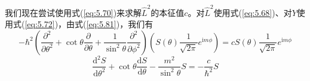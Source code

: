     我们现在尝试使用式(\ref{eq:5.70})来求解$\hat{L}^2$的本征值$c$。对$\hat{L}^2$使用式(\ref{eq:5.68})、对$Y$使用式(\ref{eq:5.72})，由式(\ref{eq:5.81})，我们有
    \begin{equation*}
        -\hbar^2\left(\frac{\partial^2}{\partial\theta^2} + \cot\theta\frac{\partial}{\partial\theta} + \frac{1}{\sin^2\theta}\frac{\partial^2}{\partial\phi^2}\right)\left(S\left(\theta\right)\frac{1}{\sqrt{2\pi}}e^{\mathrm{i}m\phi}\right) = cS\left(\theta\right)\frac{1}{\sqrt{2\pi}}e^{\mathrm{i}m\phi}
    \end{equation*}
    \begin{equation}
        \frac{\mathrm{d}^2S}{\mathrm{d}\theta^2}+\cot\theta\frac{\mathrm{d}S}{\mathrm{d}\theta} - \frac{m^2}{\sin^2\theta}S = -\frac{c}{\hbar^2}S
        \label{eq:5.82}
    \end{equation}
